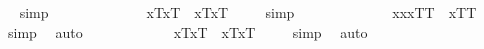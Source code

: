 \begin{isabellebody}
\isadelimproof
\ %
\endisadelimproof
%
\isatagproof
{}\isamarkupfalse%
\ simp\ \isamarkupfalse%
%
\endisatagproof
{\isafoldproof}%
%
\isadelimproof
%
\endisadelimproof
\ \ \ \ \ \ \ \ \ \isanewline
\ \isamarkupfalse%
\ {\isachardoublequoteopen}{\isacharbrackleft}{\isacharparenleft}\isactrlbold {\isasymforall}x{\isachardot}\isactrlbold {\isasymbox}{\isasymlparr}{\isasymphi}\isactrlsup T{\isacharcomma}x\isactrlsup T{\isasymrparr}{\isacharparenright}\ \isactrlbold {\isasymrightarrow}\ \isactrlbold {\isasymbox}{\isacharparenleft}\isactrlbold {\isasymforall}x{\isachardot}{\isasymlparr}{\isasymphi}\isactrlsup T{\isacharcomma}x\isactrlsup T{\isasymrparr}{\isacharparenright}{\isacharbrackright}\ {\isacharequal}\ {\isasymtop}{\isachardoublequoteclose}%
\isadelimproof
\ %
\endisadelimproof
%
\isatagproof
{}\isamarkupfalse%
\ simp\ \isamarkupfalse%
%
\endisatagproof
{\isafoldproof}%
%
\isadelimproof
%
\endisadelimproof
\ \ \ \ \ \ \ \ \ \isanewline
\isanewline
\ \isamarkupfalse%
\ {\isachardoublequoteopen}{\isacharbrackleft}{\isacharparenleft}\isactrlbold {\isasymforall}x{\isachardot}\isactrlbold {\isasymbox}{\isacharparenleft}\isactrlbold {\isasymforall}x{\isachardot}{\isasymlbrace}x\isactrlsup T{\isacharcomma}{\isasymphi}\isactrlsup T{\isasymrbrace}{\isacharparenright}\ \isactrlbold {\isasymrightarrow}\ \isactrlbold {\isasymbox}{\isasymlbrace}x\isactrlsup T{\isacharcomma}{\isasymphi}\isactrlsup T{\isasymrbrace}{\isacharparenright}{\isacharbrackright}\ {\isacharequal}\ {\isasymtop}{\isachardoublequoteclose}%
\isadelimproof
\ %
\endisadelimproof
%
\isatagproof
{}\isamarkupfalse%
\ simp\ \isamarkupfalse%
\ auto%
\endisatagproof
{\isafoldproof}%
%
\isadelimproof
%
\endisadelimproof
\ \ \ \ \ \ \ \ \ \isanewline
\ \isamarkupfalse%
\ {\isachardoublequoteopen}{\isacharbrackleft}\isactrlbold {\isasymbox}{\isacharparenleft}\isactrlbold {\isasymforall}x{\isachardot}{\isasymlparr}{\isasymphi}\isactrlsup T{\isacharcomma}x\isactrlsup T{\isasymrparr}{\isacharparenright}\ \isactrlbold {\isasymrightarrow}\ {\isacharparenleft}\isactrlbold {\isasymforall}x{\isachardot}\isactrlbold {\isasymbox}{\isasymlparr}{\isasymphi}\isactrlsup T{\isacharcomma}x\isactrlsup T{\isasymrparr}{\isacharparenright}{\isacharbrackright}\ {\isacharequal}\ {\isasymtop}{\isachardoublequoteclose}%
\isadelimproof
\ %
\endisadelimproof
%
\isatagproof
{}\isamarkupfalse%
\ simp\ \isamarkupfalse%
\ auto%
\endisatagproof
{\isafoldproof}%

\end{isabellebody}
